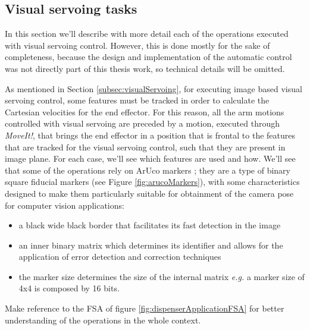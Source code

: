 \subsection{Visual servoing tasks}\label{subsec:visualServoingNellaAction}
In this section we'll describe with more detail each of the operations executed with visual servoing control. However, this is done mostly for the sake of completeness, because the design and implementation of the automatic control was not directly part of this thesis work, so technical details will be omitted.

As mentioned in Section \ref{subsec:visualServoing}, for executing image based visual servoing control, some features must be tracked in order to calculate the Cartesian velocities for the end effector. For this reason, all the arm motions controlled with visual servoing are preceded by a motion, executed through \textit{MoveIt!}, that brings the end effector in a position that is frontal to the features that are tracked for the visual servoing control, such that they are present in image plane. 
For each case, we'll see which features are used and how. We'll see that some of the operations rely on ArUco markers \parencite{aruco}; they are a type of binary square fiducial markers (see Figure \ref{fig:arucoMarkers}), with some characteristics designed to make them particularly suitable for obtainment of the camera pose for computer vision applications:
\begin{itemize}
	\item a black wide black border that facilitates its fast detection in the image\
	\item an inner binary matrix which determines its identifier and allows for the application of error detection and correction techniques
	\item  the marker size determines the size of the internal matrix \textit{e.g.} a marker size of 4x4 is composed by 16 bits.
\end{itemize}
Make reference to the \ac{FSA} of figure \ref{fig:dispenserApplicationFSA} for better understanding of the operations in the whole context.

